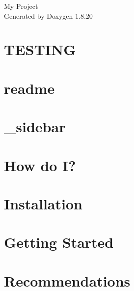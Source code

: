 \let\mypdfximage\pdfximage\def\pdfximage{\immediate\mypdfximage}\documentclass[twoside]{book}
\newcommand{\+}{\discretionary{\mbox{\scriptsize$\hookleftarrow$}}{}{}}
\newcommand{\clearemptydoublepage}{%
  \newpage{\pagestyle{empty}\cleardoublepage}%
}
\begin{document}
\hypersetup{pageanchor=false,
             bookmarksnumbered=true,
             pdfencoding=unicode
            }
\begin{titlepage}
\vspace*{7cm}
\begin{center}%
{\Large My Project }\\
\vspace*{1cm}
{\large Generated by Doxygen 1.8.20}\\
\end{center}
\end{titlepage}
\clearemptydoublepage
{}
\tableofcontents
\clearemptydoublepage
{}
\hypersetup{pageanchor=true}

\chapter{T\+E\+S\+T\+I\+NG}
\label{md_api_readme}

\chapter{readme}
\label{md_app_readme}

\chapter{\+\_\+sidebar}
\label{md_docs__sidebar}

\chapter{How do I?}
\label{md_docs_howdoi}

\chapter{Installation}
\label{md_docs_installation}

\chapter{Getting Started}
\label{md_docs__r_e_a_d_m_e}

\chapter{Recommendations}
\label{md_docs_recommendations}

\end{document}
